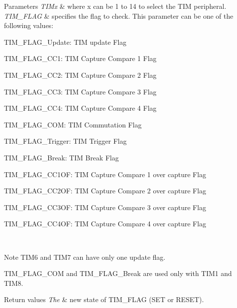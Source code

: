\begin{DoxyParams}{Parameters}
{\em T\+I\+Mx} & where x can be 1 to 14 to select the T\+IM peripheral. \\
\hline
{\em T\+I\+M\+\_\+\+F\+L\+AG} & specifies the flag to check. This parameter can be one of the following values\+: \begin{DoxyItemize}
\item T\+I\+M\+\_\+\+F\+L\+A\+G\+\_\+\+Update\+: T\+IM update Flag \item T\+I\+M\+\_\+\+F\+L\+A\+G\+\_\+\+C\+C1\+: T\+IM Capture Compare 1 Flag \item T\+I\+M\+\_\+\+F\+L\+A\+G\+\_\+\+C\+C2\+: T\+IM Capture Compare 2 Flag \item T\+I\+M\+\_\+\+F\+L\+A\+G\+\_\+\+C\+C3\+: T\+IM Capture Compare 3 Flag \item T\+I\+M\+\_\+\+F\+L\+A\+G\+\_\+\+C\+C4\+: T\+IM Capture Compare 4 Flag \item T\+I\+M\+\_\+\+F\+L\+A\+G\+\_\+\+C\+OM\+: T\+IM Commutation Flag \item T\+I\+M\+\_\+\+F\+L\+A\+G\+\_\+\+Trigger\+: T\+IM Trigger Flag \item T\+I\+M\+\_\+\+F\+L\+A\+G\+\_\+\+Break\+: T\+IM Break Flag \item T\+I\+M\+\_\+\+F\+L\+A\+G\+\_\+\+C\+C1\+OF\+: T\+IM Capture Compare 1 over capture Flag \item T\+I\+M\+\_\+\+F\+L\+A\+G\+\_\+\+C\+C2\+OF\+: T\+IM Capture Compare 2 over capture Flag \item T\+I\+M\+\_\+\+F\+L\+A\+G\+\_\+\+C\+C3\+OF\+: T\+IM Capture Compare 3 over capture Flag \item T\+I\+M\+\_\+\+F\+L\+A\+G\+\_\+\+C\+C4\+OF\+: T\+IM Capture Compare 4 over capture Flag\end{DoxyItemize}
\\
\hline
\end{DoxyParams}
\begin{DoxyNote}{Note}
T\+I\+M6 and T\+I\+M7 can have only one update flag. 

T\+I\+M\+\_\+\+F\+L\+A\+G\+\_\+\+C\+OM and T\+I\+M\+\_\+\+F\+L\+A\+G\+\_\+\+Break are used only with T\+I\+M1 and T\+I\+M8.
\end{DoxyNote}

\begin{DoxyRetVals}{Return values}
{\em The} & new state of T\+I\+M\+\_\+\+F\+L\+AG (S\+ET or R\+E\+S\+ET). \\
\hline
\end{DoxyRetVals}
